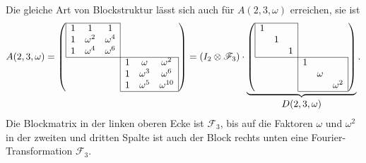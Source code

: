 Die gleiche Art von Blockstruktur lässt sich auch für $A(2,3,\omega)$
erreichen, sie ist
\[
A(2,3,\omega)
=
\left(
\def\l#1{\multicolumn{1}{|c}{#1}}
\def\r#1{\multicolumn{1}{c|}{#1}}
\begin{array}{cccccc}
\cline{1-3}
\l{1}&       1&\r{       1}&     &        &            \\
\l{1}&\omega^2&\r{\omega^4}&     &        &            \\
\l{1}&\omega^4&\r{\omega^6}&     &        &            \\
\cline{1-6}
     &        &            &\l{1}&\omega  &\r{\omega^2}\\
     &        &            &\l{1}&\omega^3&\r{\omega^6}\\
     &        &            &\l{1}&\omega^5&\r{\omega^{10}}\\
\cline{4-6}
\end{array}
\right)
=
(I_2\otimes \mathscr{F}_3)
\cdot
\underbrace{
\left(
\def\l#1{\multicolumn{1}{|c}{#1}}
\def\r#1{\multicolumn{1}{c|}{#1}}
\begin{array}{cccccc}
\cline{1-3}
\l{1}& &\r{ }&     &      &            \\
\l{ }&1&\r{ }&     &      &            \\
\l{ }& &\r{1}&     &      &            \\
\cline{1-6}
     & &     &\l{1}&      &\r{        }\\
     & &     &\l{ }&\omega&\r{        }\\
     & &     &\l{ }&      &\r{\omega^2}\\
\cline{4-6}
\end{array}
\right)}
_{\displaystyle D(2,3,\omega)}.
\]
Die Blockmatrix in der linken oberen Ecke ist $\mathscr{F}_3$,
bis auf die Faktoren $\omega$ und $\omega^2$ in der zweiten
und dritten Spalte ist auch der Block rechts unten eine
Fourier-Transformation $\mathscr{F}_3$.

